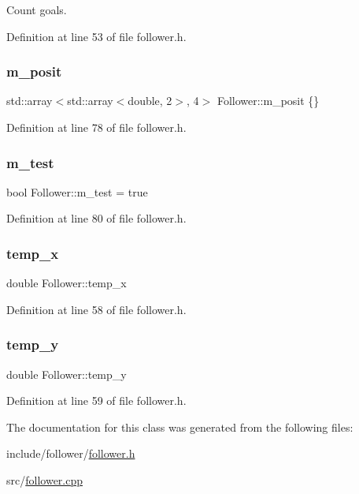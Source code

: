 Count goals. 



Definition at line 53 of file follower.\+h.

\mbox{\label{class_follower_a6d4e1ebbe79cc8af601d53cba7aeb30a}} 
\subsubsection{\texorpdfstring{m\+\_\+posit}{m\_posit}}
{\footnotesize\ttfamily std\+::array$<$std\+::array$<$double, 2$>$, 4$>$ Follower\+::m\+\_\+posit \{\}}



Definition at line 78 of file follower.\+h.

\mbox{\label{class_follower_a64e365d54197c51a8d1f777900b09647}} 
\subsubsection{\texorpdfstring{m\+\_\+test}{m\_test}}
{\footnotesize\ttfamily bool Follower\+::m\+\_\+test = true}



Definition at line 80 of file follower.\+h.

\mbox{\label{class_follower_ad27859970acb7f208f6b34e511673b26}} 
\subsubsection{\texorpdfstring{temp\+\_\+x}{temp\_x}}
{\footnotesize\ttfamily double Follower\+::temp\+\_\+x}



Definition at line 58 of file follower.\+h.

\mbox{\label{class_follower_ac5ed416e67251cffb81b99a685341bff}} 
\subsubsection{\texorpdfstring{temp\+\_\+y}{temp\_y}}
{\footnotesize\ttfamily double Follower\+::temp\+\_\+y}



Definition at line 59 of file follower.\+h.



The documentation for this class was generated from the following files\+:\begin{DoxyCompactItemize}
\item 
include/follower/\hyperlink{follower_8h}{follower.\+h}\item 
src/\hyperlink{follower_8cpp}{follower.\+cpp}\end{DoxyCompactItemize}
